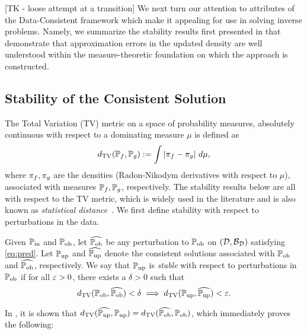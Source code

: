 [TK - loose attempt at a transition]
We next turn our attention to attributes of the Data-Consistent framework which make it appealing for use in solving inverse problems.
Namely, we summarize the stability results first presented in \cite{BJW18} that demonstrate that approximation errors in the updated density are well understood within the measure-theoretic foundation on which the approach is constructed.


\subsection{Stability of the Consistent Solution}\label{sec:stability}
The Total Variation (TV) metric on a space of probability measures, absolutely continuous with respect to a dominating measure $\mu$ is defined as
\begin{equation}\label{eq:tv}
d_{\text{TV}} (\mathbb{P}_f, \mathbb{P}_g) := \int \left\vert\pi_f - \pi_g\right\vert \, d\mu,
\end{equation}
where $\pi_f,\pi_g$ are the densities (Radon-Nikodym derivatives with respect to $\mu$), associated with measures $\mathbb{P}_f, \mathbb{P}_g$, respectively.
The stability results below are all with respect to the TV metric, which is widely used in the literature and is also known as \emph{statistical distance}~\cite{GS02, Smith, Silverman}.
We first define stability with respect to perturbations in the data.

\begin{defn}\label{defn:stableobs}
  Given $\operatorname*{\mathbb{P}_{in}}$ and $\operatorname*{\mathbb{P}_{ob}}$, let $\widehat{\operatorname*{\mathbb{P}_{ob}}}$ be any perturbation to $\operatorname*{\mathbb{P}_{ob}}$ on $(\mathcal{D}, \mathcal{B}_{\mathcal{D}})$ satisfying \eqref{eq:pred}.
  Let $\operatorname*{\mathbb{P}_{up}}$ and $\widehat{\operatorname*{\mathbb{P}_{up}}}$ denote the consistent solutions associated with $\operatorname*{\mathbb{P}_{ob}}$ and $\widehat{\operatorname*{\mathbb{P}_{ob}}}$, respectively.
  We say that $\operatorname*{\mathbb{P}_{up}}$ is \emph{stable} with respect to perturbations in $\operatorname*{\mathbb{P}_{ob}}$ if for all $\varepsilon > 0$, there exists a $\delta > 0$ such that
  \begin{equation}
    d_{\text{TV}} (\operatorname*{\mathbb{P}_{ob}}, \widehat{\operatorname*{\mathbb{P}_{ob}}}) < \delta \implies d_{\text{TV}} (\operatorname*{\mathbb{P}_{up}}, \widehat{\operatorname*{\mathbb{P}_{up}}}) < \varepsilon.
  \end{equation}
\end{defn}

In \cite{BJW18}, it is shown that $d_{\text{TV}} (\widehat{\operatorname*{\mathbb{P}_{up}}}, \operatorname*{\mathbb{P}_{up}}) = d_{\text{TV}} (\widehat{\operatorname*{\mathbb{P}_{ob}}}, \operatorname*{\mathbb{P}_{ob}})$, which immediately proves the following:

